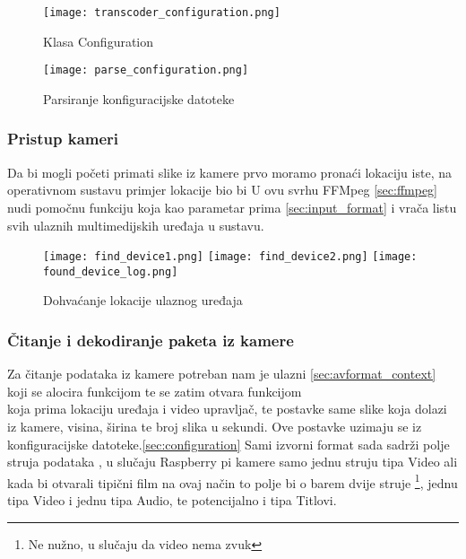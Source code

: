 \begin{figure}[h]
  \centering
  \texttt{[image: transcoder\_configuration.png]}
  \caption{Klasa Configuration}
\end{figure}
\clearpage
\begin{figure}[h]
  \centering
  \texttt{[image: parse\_configuration.png]}
  \caption{Parsiranje konfiguracijske datoteke}
\end{figure}
\clearpage

\subsubsection{Pristup kameri}
Da bi mogli početi primati slike iz kamere prvo moramo pronaći lokaciju iste, na  operativnom sustavu
primjer lokacije bio bi 
\paraBreak
U ovu svrhu FFMpeg \ref{sec:ffmpeg} nudi pomočnu funkciju  koja kao parametar
prima  \ref{sec:input_format} i vrača listu svih ulaznih multimedijskih uređaja u sustavu.
\paraBreak

\begin{figure}[h]
  \texttt{[image: find\_device1.png]}
  \texttt{[image: find\_device2.png]}
  \texttt{[image: found\_device\_log.png]}
  \caption{Dohvaćanje lokacije ulaznog uređaja}
\end{figure}

\subsubsection{Čitanje i dekodiranje paketa iz kamere}
Za čitanje podataka iz kamere potreban nam je ulazni  \ref{sec:avformat_context} koji se alocira funkcijom 
 te se zatim otvara funkcijom \\
 koja prima lokaciju uređaja  i video upravljač, te postavke same slike koja dolazi
iz kamere, visina, širina te broj slika u sekundi.
Ove postavke uzimaju se iz konfiguracijske datoteke.\ref{sec:configuration}
\paraBreak
Sami izvorni format sada sadrži polje struja podataka , u slučaju Raspberry pi kamere samo jednu struju
tipa Video ali kada bi otvarali tipični film na ovaj način to polje bi o barem dvije struje 
\footnote{Ne nužno, u slučaju da video nema zvuk}, jednu tipa Video i jednu tipa Audio, te potencijalno i tipa Titlovi.

